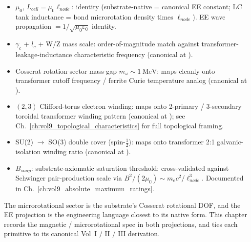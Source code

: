 \begin{itemize}
    \item $\mu_0$, $L_{cell} = \mu_0 \ell_{node}$: identity (substrate-native = canonical EE constant; LC tank inductance = bond microrotation density times $\ell_{node}$). EE wave propagation $= 1/\sqrt{\mu_0 \varepsilon_0}$ identity.
    \item $\gamma_c$ + $l_c$ + W/Z mass scale: order-of-magnitude match against transformer-leakage-inductance characteristic frequency (canonical at ).
    \item Cosserat rotation-sector mass-gap $m_\omega \sim \qty{1}{\mega\electronvolt}$: maps cleanly onto transformer cutoff frequency / ferrite Curie temperature analog (canonical at ).
    \item $(2, 3)$ Clifford-torus electron winding: maps onto 2-primary / 3-secondary toroidal transformer winding pattern (canonical at ); see Ch.~\ref{ch:vol9_topological_characteristics} for full topological framing.
    \item SU(2) $\to$ SO(3) double cover (spin-$\tfrac{1}{2}$): maps onto transformer 2:1 galvanic-isolation winding ratio (canonical at ).
    \item $B_{snap}$: substrate-axiomatic saturation threshold; cross-validated against Schwinger pair-production scale via $B^2/(2\mu_0) \sim m_e c^2 / \ell_{node}^3$. Documented in Ch.~\ref{ch:vol9_absolute_maximum_ratings}.
\end{itemize}

The microrotational sector is the substrate's Cosserat rotational DOF, and the EE projection is the engineering language closest to its native form. This chapter records the magnetic / microrotational spec in both projections, and ties each primitive to its canonical Vol~I / II / III derivation.
